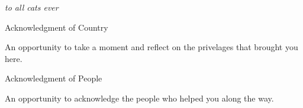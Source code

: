 \newpage


\thispagestyle{empty}


\begin{center}
	\vspace*{\fill}
\textit {to all cats ever} \\
	\vspace*{\fill}
\end{center}

\clearpage


\begin{center}
\begin{Large}
\begin{bfseries}
Acknowledgment of Country
\end{bfseries}
\end{Large}
\end{center}
An opportunity to take a moment and reflect on the privelages that brought you here.
\begin{center}
\begin{Large}
\begin{bfseries}
Acknowledgment of People
\end{bfseries}
\end{Large}
\end{center}
An opportunity to acknowledge the people who helped you along the way.
